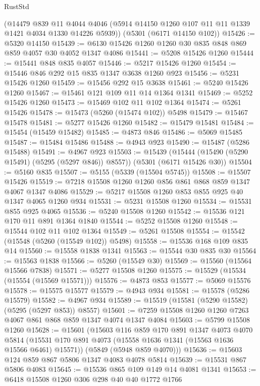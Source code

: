 \begin{lexlean}{RustStd}
\begin{coremodule}
    (@14479
      @839
      @11
      @4044
      @4046
      (@5914 @14150 @1260 @107 @11 @11 @1339 @1421 @4034 @1330 @14226 @5939))
    (@5301 (@6171 @14150 @102))
@15426 := @5320 @14150
@15439 := @6130 @15426 @1260 @1260 @30 @835 @848 @869 @859 @4057 @30 @4052 @1347 @4086
@15441 := @5208 @15426 @1260
@15444 := @15441 @848 @835 @4057
@15446 := @5217 @15426 @1260
@15454 := @15446 @846 @292 @15 @835 @1347 @3638 @1260 @923
@15456 := @5231 @15426 @1260
@15459 := @15456 @292 @15 @3638
@15461 := @5240 @15426 @1260
@15467 := @15461 @121 @109 @11 @14 @1364 @1341
@15469 := @5252 @15426 @1260
@15473 := @15469 @102 @11 @102 @1364
@15474 := @5261 @15426
@15478 := @15473 (@5260 (@15474 @102)) @5498
@15479 := @15467 @15478
@15481 := @5277 @15426 @1260
@15482 := @15479 @15481
@15484 := @15454 (@15459 @15482)
@15485 := @4873 @846
@15486 := @5069 @15485
@15487 := @15484 @15486
@15488 := @4943 @923
@15490 := @15487 (@5286 @15488)
@15491 := @4967 @923
@15503 := @15439
    (@15444 (@15490 (@5290 @15491) (@5295 (@5297 @846)) @8557))
    (@5301 (@6171 @15426 @30))
@15504 := @5160 @835
@15507 := @5155 (@5339 (@15504 @5745))
@15508 := @15507 @15426
@15519 := @7218 @15508 @1260 @1260 @856 @861 @868 @859 @1347 @4067 @1347 @4086
@15529 := @5217 @15508 @1260 @853 @855 @925 @40 @1347 @4065 @1260 @934
@15531 := @5231 @15508 @1260
@15534 := @15531 @855 @925 @4065
@15536 := @5240 @15508 @1260
@15542 := @15536 @121 @170 @11 @891 @1364 @1840
@15544 := @5252 @15508 @1260
@15548 := @15544 @102 @11 @102 @1364
@15549 := @5261 @15508
@15554 := @15542 (@15548 (@5260 (@15549 @102)) @5498)
@15558 := @15536 @168 @109 @835 @14
@15560 := @15558 @1838 @1341
@15563 := @15544 @30 @835 @30
@15564 := @15563 @1838
@15566 := @5260 (@15549 @30)
@15569 := @15560 (@15564 @15566 @7838)
@15571 := @5277 @15508 @1260
@15575 := @15529 (@15534 (@15554 (@15569 @15571)))
@15576 := @4873 @853
@15577 := @5069 @15576
@15578 := @15575 @15577
@15579 := @4943 @934
@15581 := @15578 (@5286 @15579)
@15582 := @4967 @934
@15589 := @15519 (@15581 (@5290 @15582) (@5295 (@5297 @853)) @8557)
@15601 := @7259 @15508 @1260 @1260 @7263 @4067 @861 @868 @859 @1347 @4074 @1347 @4084
@15603 := @5799 @15508 @1260
@15628 := @15601
    (@15603
      @116
      @859
      @170
      @891
      @1347
      @4073
      @4070
      @5814
      (@15531 @170 @891 @4073 (@15558 @1636 @1341 (@15563 @1636 @15566 @6461) @15571))
      (@5849 (@5948 @859 @4070)))
@15636 := @15603 @124 @859 @867 @5806 @1347 @4083 @4078 @5814
@15639 := @15531 @867 @5806 @4083
@15645 := @15536 @865 @109 @149 @14 @4081 @1341
@15653 := @6418 @15508 @1260 @306 @298 @40 @40 @1772 @1766

\end{coremodule}
\end{lexlean}
